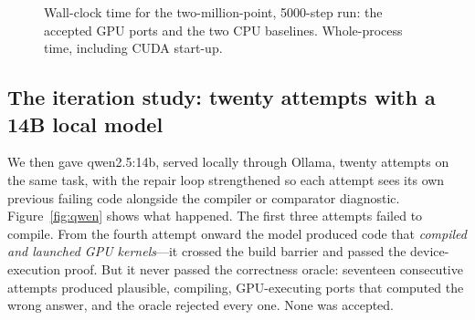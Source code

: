 \documentclass[11pt]{article}
\begin{document}
\begin{figure}[htbp]
\centering
{}
\caption{Wall-clock time for the two-million-point, 5000-step run: the accepted
GPU ports and the two CPU baselines. Whole-process
time, including CUDA start-up.}
\label{fig:time}
\end{figure}

\subsection{The iteration study: twenty attempts with a 14B local model}

We then gave qwen2.5:14b, served locally through Ollama, twenty attempts on the
same task, with the repair loop strengthened so each attempt sees its own
previous failing code alongside the compiler or comparator diagnostic.
Figure~\ref{fig:qwen} shows what happened. The first three attempts failed to
compile. From the fourth attempt onward the model produced code that
\emph{compiled and launched GPU kernels}---it crossed the build barrier and
passed the device-execution proof. But it never passed the correctness oracle:
seventeen consecutive attempts produced plausible, compiling, GPU-executing ports
that computed the wrong answer, and the oracle rejected every one. None was
accepted.
\end{document}
